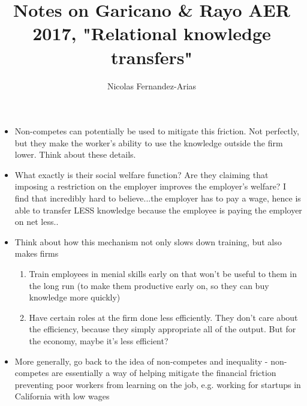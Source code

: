 \documentclass[12pt,english]{article}
\theoremstyle{remark}
\begin{document}
\title{Notes on Garicano \& Rayo AER 2017, "Relational knowledge transfers"}
\author{Nicolas Fernandez-Arias}
\maketitle

\begin{itemize}
	\item Non-competes can potentially be used to mitigate this friction. Not perfectly, but they make the worker's ability to use the knowledge outside the firm lower. Think about these details.
	\item What exactly is their social welfare function? Are they claiming that imposing a restriction on the employer improves the employer's welfare? I find that incredibly hard to believe...the employer has to pay a wage, hence is able to transfer LESS knowledge because the employee is paying the employer on net less..
	\item Think about how this mechanism not only slows down training, but also makes firms
	\begin{enumerate}
		\item Train employees in menial skills early on that won't be useful to them in the long run (to make them productive early on, so they can buy knowledge more quickly)
		\item Have certain roles at the firm done less efficiently. They don't care about the efficiency, because they simply appropriate all of the output. But for the economy, maybe it's less efficient?
	\end{enumerate} 
	\item More generally, go back to the idea of non-competes and inequality - non-competes are essentially a way of helping mitigate the financial friction preventing poor workers from learning on the job, e.g. working for startups in California with low wages 
\end{itemize}
\end{document}
